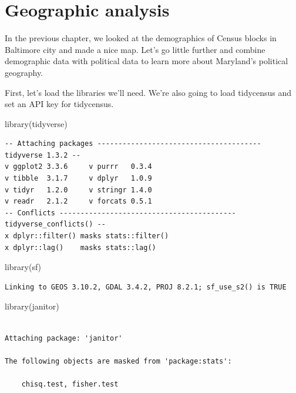 \documentclass[
  letterpaper,
  DIV=11,
  numbers=noendperiod]{scrreprt}
\newenvironment{Shaded}{\begin{snugshade}}{\end{snugshade}}
\newcommand{\FunctionTok}[1]{\textcolor[rgb]{0.28,0.35,0.67}{#1}}
\newcommand{\NormalTok}[1]{\textcolor[rgb]{0.00,0.23,0.31}{#1}}
\begin{document}

\hypertarget{geographic-analysis}{%
\chapter{Geographic analysis}\label{geographic-analysis}}

In the previous chapter, we looked at the demographics of Census blocks
in Baltimore city and made a nice map. Let's go little further and
combine demographic data with political data to learn more about
Maryland's political geography.

First, let's load the libraries we'll need. We're also going to load
tidycensus and set an API key for tidycensus.

\begin{Shaded}
\begin{Highlighting}[]
\FunctionTok{library}\NormalTok{(tidyverse)}
\end{Highlighting}
\end{Shaded}

\begin{verbatim}
-- Attaching packages --------------------------------------- tidyverse 1.3.2 --
v ggplot2 3.3.6     v purrr   0.3.4
v tibble  3.1.7     v dplyr   1.0.9
v tidyr   1.2.0     v stringr 1.4.0
v readr   2.1.2     v forcats 0.5.1
-- Conflicts ------------------------------------------ tidyverse_conflicts() --
x dplyr::filter() masks stats::filter()
x dplyr::lag()    masks stats::lag()
\end{verbatim}

\begin{Shaded}
\begin{Highlighting}[]
\FunctionTok{library}\NormalTok{(sf)}
\end{Highlighting}
\end{Shaded}

\begin{verbatim}
Linking to GEOS 3.10.2, GDAL 3.4.2, PROJ 8.2.1; sf_use_s2() is TRUE
\end{verbatim}

\begin{Shaded}
\begin{Highlighting}[]
\FunctionTok{library}\NormalTok{(janitor)}
\end{Highlighting}
\end{Shaded}

\begin{verbatim}

Attaching package: 'janitor'

The following objects are masked from 'package:stats':

    chisq.test, fisher.test
\end{verbatim}
\end{document}
